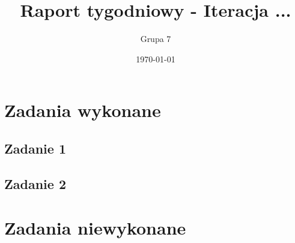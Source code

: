\documentclass[a4paper]{article}
\title{Raport tygodniowy - Iteracja ...}
\date{\today}
\author{Grupa 7}
\begin{document}
\maketitle

\section{Zadania wykonane}
\subsection{Zadanie 1}
\subsection{Zadanie 2}

\section{Zadania niewykonane}

   
\end{document}
